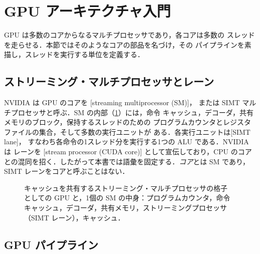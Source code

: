 \documentclass[../main.tex]{subfiles}
\begin{document}
\section{GPU アーキテクチャ入門}
\label{sec:l01-gpu-architecture}

GPU は多数のコアからなるマルチプロセッサであり，各コアは多数の
スレッドを走らせる．本節ではそのようなコアの部品を名づけ，その
パイプラインを素描し，スレッドを実行する単位を定義する．

\subsection{ストリーミング・マルチプロセッサとレーン}

NVIDIA は GPU のコアを
[streaming multiprocessor (SM)]，
または SIMT マルチプロセッサと呼ぶ．SM の内部（\cref{fig:l01-sm}）には，命令
キャッシュ，デコーダ，共有メモリのブロック，保持するスレッドのための
プログラムカウンタとレジスタファイルの集合，そして多数の実行ユニットが
ある．各実行ユニットは[SIMT lane]，
すなわち各命令の1スレッド分を実行する1つの ALU である．NVIDIA は
レーンを
[stream processor (CUDA core)]
として宣伝しており，CPU のコアとの混同を招く．したがって本書では語彙を固定する．\emph{コア}とは SM
であり，SIMT レーンをコアと呼ぶことはない．

\begin{figure}[htbp]
  \centering
  
  \caption{キャッシュを共有するストリーミング・マルチプロセッサの格子
    としての GPU と，1個の SM の中身：プログラムカウンタ，命令
    キャッシュ，デコーダ，共有メモリ，ストリーミングプロセッサ（SIMT
    レーン），キャッシュ．}
  \label{fig:l01-sm}
\end{figure}

\subsection{GPU パイプライン}
\end{document}
